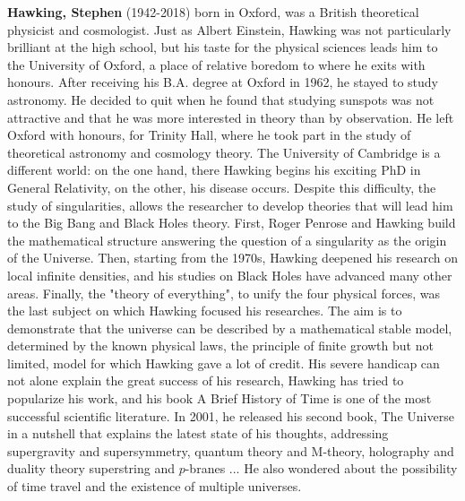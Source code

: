 \textbf{Hawking, Stephen} (1942-2018) born in Oxford, was a British theoretical physicist and cosmologist. Just as Albert Einstein, Hawking was not particularly brilliant at the high school, but his taste for the physical sciences leads him to the University of Oxford, a place of relative boredom to where he exits with honours. After receiving his B.A. degree at Oxford in 1962, he stayed to study astronomy. He decided to quit when he found that studying sunspots was not attractive and that he was more interested in theory than by observation. He left Oxford with honours, for Trinity Hall, where he took part in the study of theoretical astronomy and cosmology theory. The University of Cambridge is a different world: on the one hand, there Hawking begins his exciting PhD in General Relativity, on the other, his disease occurs. Despite this difficulty, the study of singularities, allows the researcher to develop theories that will lead him to the Big Bang and Black Holes theory. First, Roger Penrose and Hawking build the mathematical structure answering the question of a singularity as the origin of the Universe. Then, starting from the 1970s, Hawking deepened his research on local infinite densities, and his studies on Black Holes have advanced many other areas. Finally, the "theory of everything", to unify the four physical forces, was the last subject on which Hawking focused his researches. The aim is to demonstrate that the universe can be described by a mathematical stable model, determined by the known physical laws, the principle of finite growth but not limited, model for which Hawking gave a lot of credit. His severe handicap can not alone explain the great success of his research, Hawking has tried to popularize his work, and his book A Brief History of Time is one of the most successful scientific literature. In 2001, he released his second book, The Universe in a nutshell that explains the latest state of his thoughts, addressing supergravity and supersymmetry, quantum theory and M-theory, holography and duality theory superstring and $p$-branes ... He also wondered about the possibility of time travel and the existence of multiple universes.

